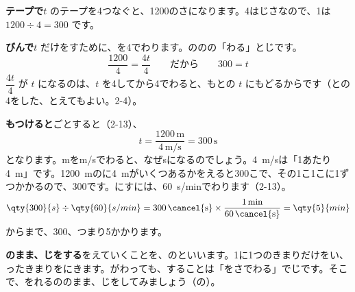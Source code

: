 \noindent\begin{minipage}[c]{0.5\linewidth}
\textbf{テープで}\quad $t$ のテープを4つなぐと、1200のさになります。4はじさなので、1は $1200\div4=300$ です。
\end{minipage}\hfill
\begin{minipage}[c]{0.47\linewidth}\centering
{}
\end{minipage}

\vspace{4pt}
\textbf{びんで}\quad $t$ だけをすために、を4でわります。ののの「わる」とじです。
\[ \frac{1200}{4}=\frac{4t}{4}\qquad\text{だから}\qquad 300=t \]
$\dfrac{4t}{4}$ が $t$ になるのは、$t$ を4してから4でわると、もとの $t$ にもどるからです（との4をした、とえてもよい。2-4）。

\textbf{もつけると}\quad {}ごとすると（2-13）、
\[ t=\frac{1200\,\mathrm{m}}{4\,\mathrm{m/s}}=300\,\mathrm{s} \]
となります。mをm/sでわると、なぜsになるのでしょう。\qty{4}{m/s}は「1あたり\qty{4}{m}」です。\qty{1200}{m}のに\qty{4}{m}がいくつあるかをえると300こで、その1こ1こに1ずつかかるので、300です。にすには、\qty{60}{s/min}でわります（2-13）。
\[ \qty{300}{s}\div\qty{60}{s/min}=300\,\cancel{\mathrm{s}}\times\frac{1\,\mathrm{min}}{60\,\cancel{\mathrm{s}}}=\qty{5}{min} \]
からまで、300、つまり5かかります。

\textbf{のまま、じをする}\quad {}をえていくことを、の\textbf{}といいます。1に1つのきまりだけをい、ったきまりをにきます。がわっても、することは「をさでわる」でじです。そこで、をれるののまま、じをしてみましょう（の）。

